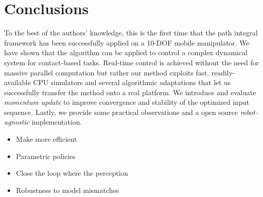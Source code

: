 \section{Conclusions} \label{sec:conclusions}
To the best of the authors' knowledge, this is the first time that the path integral framework has been successfully applied on a 10-DOF mobile manipulator. We have shown that the algorithm can be applied to control a complex dynamical system for contact-based tasks. Real-time control is achieved without the need for massive parallel computation but rather our method exploits fast, readily-available CPU simulators and several algorithmic adaptations that let us successfully transfer the method onto a real platform. We introduce and evaluate \textit{momentum update} to improve convergence and stability of the optimized input sequence. Lastly, we provide some practical observations and a open source \textit{robot-agnostic} implementation. 

\begin{itemize}
    \item Make more efficient
    \item Parametric policies
    \item Close the loop where the perception 
    \item Robustness to model mismatches
\end{itemize}
